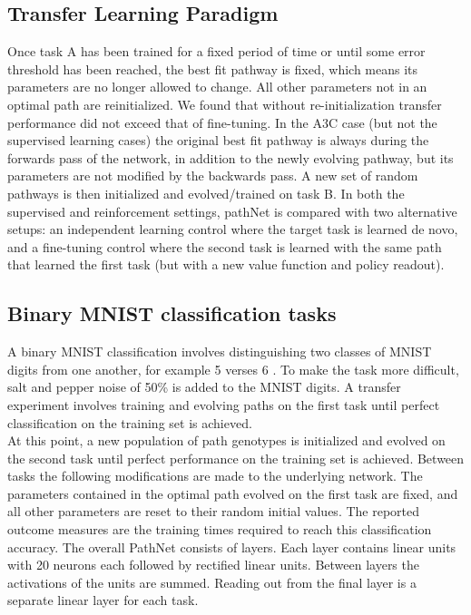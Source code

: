\documentclass{sig-alternate-05-2015}
\begin{document}
\subsection{Transfer Learning Paradigm} 
Once task A has been trained for a fixed period of time or until some error threshold has been reached, the best fit pathway is fixed, which means its parameters are no longer allowed to change. All other parameters not in an optimal path are reinitialized. We found that without re-initialization transfer performance did not exceed that of fine-tuning. In the A3C case (but not the supervised learning cases) the original best fit pathway is always  during the forwards pass of the network, in addition to the newly evolving pathway, but its parameters are not modified by the backwards pass. A new set of random pathways is then initialized and evolved/trained on task B. In both the supervised and reinforcement settings, pathNet is compared with two alternative setups: an independent learning control where the target task is learned de novo, and a fine-tuning control where the second task is learned with the same path that learned the first task (but with a new value function and policy readout).  \\

\subsection{Binary MNIST classification tasks} 
A binary MNIST classification involves distinguishing two classes of MNIST digits from one another, for example 5 verses 6 \cite{lecun1998gradient}. To make the task more difficult, salt and pepper noise of 50\% is added to the MNIST digits. A transfer experiment involves training and evolving paths on the first task until perfect classification on the training set is achieved.\\

At this point, a new population of path genotypes is initialized and evolved on the second task until perfect performance on the training set is achieved. Between tasks the following modifications are made to the underlying network. The parameters contained in the optimal path evolved on the first task are fixed, and all other parameters are reset to their random initial values. The reported outcome measures are the training times required to reach this classification accuracy. The overall PathNet consists of  layers. Each layer contains  linear units with 20 neurons each followed by rectified linear units. Between layers the activations of the units are summed. Reading out from the final layer is a separate linear layer for each task.\\
\end{document}
